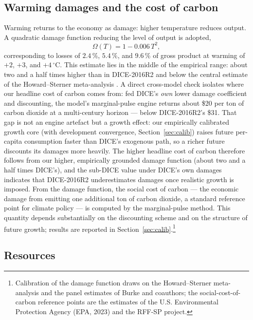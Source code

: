 \documentclass[11pt,a4paper]{article}
\begin{document}
\subsection{Warming damages and the cost of carbon}

Warming returns to the economy as damage: higher temperature reduces output. A quadratic damage
function reducing the level of output is adopted,
\begin{equation}
\Omega(T) = 1 - 0.006\,T^{2},
\label{eq:damage}
\end{equation}
corresponding to losses of $2.4\,\%$, $5.4\,\%$, and $9.6\,\%$ of gross product at warming of $+2$,
$+3$, and $+4\,^\circ$C. This estimate lies in the middle of the empirical range: about two and a
half times higher than in DICE-2016R2 and below the central estimate of the Howard--Sterner
meta-analysis \citep{howard2017,burke2015}. A direct cross-model check isolates where our headline
cost of carbon comes from: fed DICE's \emph{own} lower damage coefficient and discounting, the
model's marginal-pulse engine returns about \$20 per ton of carbon dioxide at a multi-century
horizon --- below DICE-2016R2's \$31. That gap is not an engine artefact but a growth effect: our
empirically calibrated growth core (with development convergence, Section~\ref{sec:calib}) raises
future per-capita consumption faster than DICE's exogenous path, so a richer future discounts its
damages more heavily. The higher headline cost of carbon therefore follows from our higher,
empirically grounded damage function (about two and a half times DICE's), and the sub-DICE value
under DICE's own damages indicates that DICE-2016R2 underestimates damages once realistic growth is
imposed. From the damage function, the social cost of carbon ---
the economic damage from emitting one additional ton of carbon dioxide, a standard reference point
for climate policy --- is computed by the marginal-pulse method. This quantity depends substantially
on the discounting scheme and on the structure of future growth; results are reported in
Section~\ref{sec:calib}.\footnote{Calibration of the damage function draws on the Howard--Sterner
meta-analysis and the panel estimates of Burke and coauthors; the social-cost-of-carbon reference
points are the estimates of the U.S. Environmental Protection Agency (EPA, 2023) and the RFF-SP
project.}

\subsection{Resources}
\end{document}

